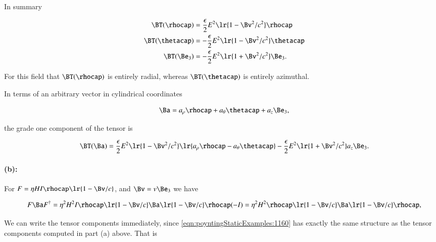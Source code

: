 In summary

\begin{dmath}\label{eqn:poyntingStaticExamples:1080}
\begin{aligned}
\BT(\rhocap) &= \frac{\epsilon}{2} E^2 \lr{1 -\Bv^2/c^2} \rhocap \\
\BT(\thetacap) &= -\frac{\epsilon}{2} E^2 \lr{1 -\Bv^2/c^2} \thetacap \\
\BT(\Be_3) &= -\frac{\epsilon}{2} E^2 \lr{1 + \Bv^2/c^2 } \Be_3.
\end{aligned}
\end{dmath}

For this field that \( \BT(\rhocap) \) is entirely radial, whereas \( \BT(\thetacap) \) is entirely azimuthal.

In terms of an arbitrary vector in cylindrical coordinates

\begin{dmath}\label{eqn:poyntingStaticExamples:1200}
\Ba = a_\rho \rhocap + a_\theta \thetacap + a_z \Be_3,
\end{dmath}

the grade one component of the tensor is

\begin{dmath}\label{eqn:poyntingStaticExamples:1140}
\BT(\Ba) =
\frac{\epsilon}{2} E^2 \lr{1 -\Bv^2/c^2} \lr{ a_\rho \rhocap - a_\theta \thetacap }
-\frac{\epsilon}{2} E^2 \lr{1 +\Bv^2/c^2} a_z \Be_3.
\end{dmath}

\paragraph{(b):}

For \( F = \eta H I \rhocap \lr{ 1 - \Bv/c } \), and \( \Bv = v \Be_3 \) we have

\begin{dmath}\label{eqn:poyntingStaticExamples:1160}
F \Ba F^\dagger
=
\eta^2 H^2 I \rhocap \lr{ 1 - \Bv/c } \Ba \lr{ 1 - \Bv/c } \rhocap (-I)
=
\eta^2 H^2 \rhocap \lr{ 1 - \Bv/c } \Ba \lr{ 1 - \Bv/c } \rhocap,
\end{dmath}

We can write the tensor components immediately, since
\cref{eqn:poyntingStaticExamples:1160}
has exactly the same structure as the tensor components computed in part (a) above.  That is

